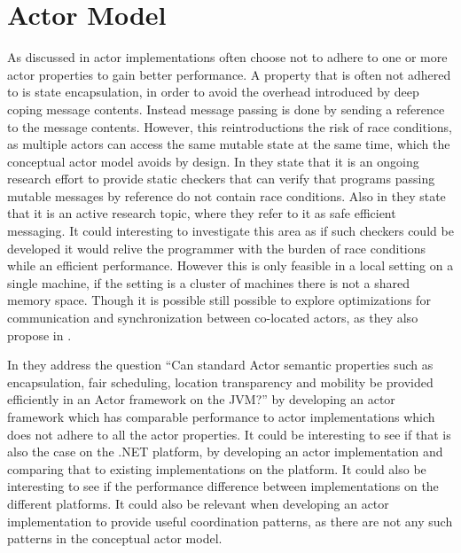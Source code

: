 \section{Actor Model}
As discussed in  actor implementations often choose not to adhere to one or more actor properties to gain better performance. A property that is often not adhered to is state encapsulation, in order to avoid the overhead introduced by deep coping message contents. Instead message passing is done by sending a reference to the message contents. However, this reintroductions the risk of race conditions, as multiple actors can access the same mutable state at the same time, which the conceptual actor model avoids by design. In \cite[p. 15]{haller2012actors} they state that it is an ongoing research effort to provide static checkers that can verify that programs passing mutable messages by reference do not contain race conditions. Also in \cite[p. 9]{karmani2009actor} they state that it is an active research topic, where they refer to it as safe efficient messaging. It could interesting to investigate this area as if such checkers could be developed it would relive the programmer with the burden of race conditions while an efficient performance. However this is only feasible in a local setting on a single machine, if the setting is a cluster of machines there is not a shared memory space. Though it is possible still possible to explore optimizations for communication and synchronization between co-located actors, as they also propose in \cite[p. 9]{karmani2009actor}.

In \cite{karmani2009actor} they address the question ``Can standard Actor semantic properties such as encapsulation, fair scheduling, location transparency and mobility be provided efficiently in an Actor framework on the JVM?'' by developing an actor framework which has comparable performance to actor implementations which does not adhere to all the actor properties. It could be interesting to see if that is also the case on the .NET platform, by developing an actor implementation and comparing that to existing implementations on the platform. It could also be interesting to see if the performance difference between implementations on the different platforms. It could also be relevant when developing an actor implementation to provide useful coordination patterns, as there are not any such patterns in the conceptual actor model.

